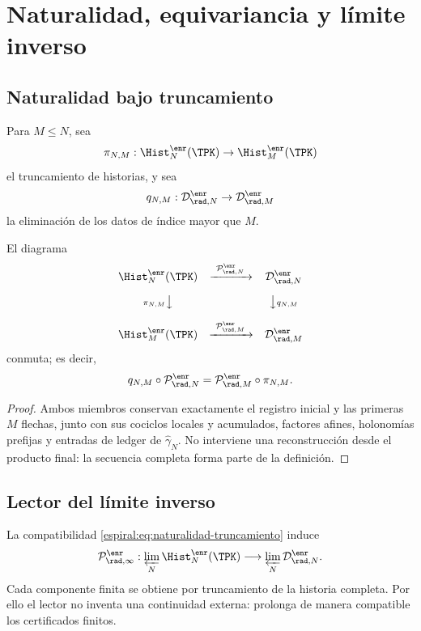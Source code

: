 \chapter{Naturalidad, equivariancia y límite inverso}

\section{Naturalidad bajo truncamiento}

Para \(M\le N\), sea
\[
 \pi_{N,M}:\Hist_N^{\enr}(\TPK)\to\Hist_M^{\enr}(\TPK)
\]
el truncamiento de historias, y sea
\[
 q_{N,M}:\mathcal D_{\rad,N}^{\enr}\to
 \mathcal D_{\rad,M}^{\enr}
\]
la eliminación de los datos de índice mayor que \(M\).

\begin{theorem}
El diagrama
\[
\begin{array}{ccc}
\Hist_N^{\enr}(\TPK)
 & \xrightarrow{\ \mathcal P_{\rad,N}^{\enr}\ }
 & \mathcal D_{\rad,N}^{\enr}\\[1.0em]
{\scriptstyle \pi_{N,M}}\big\downarrow
 && \big\downarrow{\scriptstyle q_{N,M}}\\[1.0em]
\Hist_M^{\enr}(\TPK)
 & \xrightarrow{\ \mathcal P_{\rad,M}^{\enr}\ }
 & \mathcal D_{\rad,M}^{\enr}
\end{array}
\]
conmuta; es decir,
\begin{equation}
 q_{N,M}\circ\mathcal P_{\rad,N}^{\enr}
 =\mathcal P_{\rad,M}^{\enr}\circ\pi_{N,M}.
 \label{espiral:eq:naturalidad-truncamiento}
\end{equation}
\end{theorem}
\begin{proof}
Ambos miembros conservan exactamente el registro inicial y las primeras
\(M\) flechas, junto con sus cociclos locales y acumulados, factores afines,
holonomías prefijas y entradas de ledger de \(\widehat\gamma_N\). No
interviene una reconstrucción desde el producto final: la secuencia completa
forma parte de la definición.
\end{proof}

\section{Lector del límite inverso}

La compatibilidad \cref{espiral:eq:naturalidad-truncamiento} induce
\begin{equation}
 \mathcal P_{\rad,\infty}^{\enr}:
 \varprojlim_N\Hist_N^{\enr}(\TPK)
 \longrightarrow
 \varprojlim_N\mathcal D_{\rad,N}^{\enr}.
 \label{espiral:eq:lector-limite-inverso}
\end{equation}
Cada componente finita se obtiene por truncamiento de la historia completa.
Por ello el lector no inventa una continuidad externa: prolonga de manera
compatible los certificados finitos.

